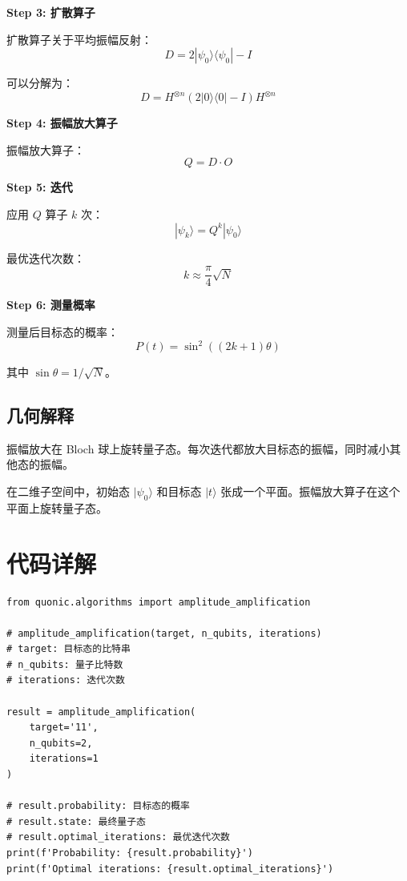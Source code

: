 \documentclass[12pt,a4paper]{article}
\begin{document}
\textbf{Step 3: 扩散算子}

扩散算子关于平均振幅反射：
\begin{equation}
D = 2|\psi_0\rangle\langle\psi_0| - I
\end{equation}

可以分解为：
\begin{equation}
D = H^{\otimes n} (2|0\rangle\langle 0| - I) H^{\otimes n}
\end{equation}

\textbf{Step 4: 振幅放大算子}

振幅放大算子：
\begin{equation}
Q = D \cdot O
\end{equation}

\textbf{Step 5: 迭代}

应用 $Q$ 算子 $k$ 次：
\begin{equation}
|\psi_k\rangle = Q^k |\psi_0\rangle
\end{equation}

最优迭代次数：
\begin{equation}
k \approx \frac{\pi}{4} \sqrt{N}
\end{equation}

\textbf{Step 6: 测量概率}

测量后目标态的概率：
\begin{equation}
P(t) = \sin^2((2k+1)\theta)
\end{equation}

其中 $\sin\theta = 1/\sqrt{N}$。

\subsection{几何解释}

振幅放大在 Bloch 球上旋转量子态。每次迭代都放大目标态的振幅，同时减小其他态的振幅。

在二维子空间中，初始态 $|\psi_0\rangle$ 和目标态 $|t\rangle$ 张成一个平面。振幅放大算子在这个平面上旋转量子态。

\section{代码详解}

\begin{verbatim}
from quonic.algorithms import amplitude_amplification

# amplitude_amplification(target, n_qubits, iterations)
# target: 目标态的比特串
# n_qubits: 量子比特数
# iterations: 迭代次数

result = amplitude_amplification(
    target='11',
    n_qubits=2,
    iterations=1
)

# result.probability: 目标态的概率
# result.state: 最终量子态
# result.optimal_iterations: 最优迭代次数
print(f'Probability: {result.probability}')
print(f'Optimal iterations: {result.optimal_iterations}')
\end{verbatim}
\end{document}
